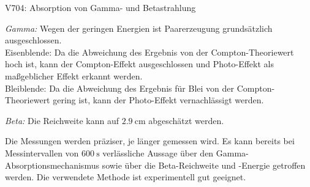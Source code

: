 \begin{Versuch}{V704: Absorption von Gamma- und Betastrahlung}
\begin{Durchführung}
        \end{Durchführung}        
        
        \begin{Auswertung}
        	\emph{Gamma:} Wegen der geringen Energien ist Paarerzeugung grundsätzlich ausgeschlossen.\\
        	Eisenblende: Da die Abweichung des Ergebnis von der Compton-Theoriewert hoch ist,
        	kann der Compton-Effekt ausgeschlossen und Photo-Effekt als maßgeblicher Effekt erkannt werden.\\
        	Bleiblende: Da die Abweichung des Ergebnis für Blei von der Compton-Theoriewert gering ist,
        	kann der Photo-Effekt vernachlässigt werden.

        	\emph{Beta:} Die Reichweite kann auf $\SI{2,9}{\centi\meter}$ abgeschätzt werden. 
        \end{Auswertung}

        \begin{Diskussion}
        	Die Messungen werden präziser, je länger gemessen wird.
        	Es kann bereits bei Messintervallen von $\SI{600}{\second}$ verlässliche Aussage über den Gamma-Absorptionsmechanismus sowie über die Beta-Reichweite und -Energie getroffen werden.
        	Die verwendete Methode ist experimentell gut geeignet.
        \end{Diskussion}
    \end{Versuch}
    
